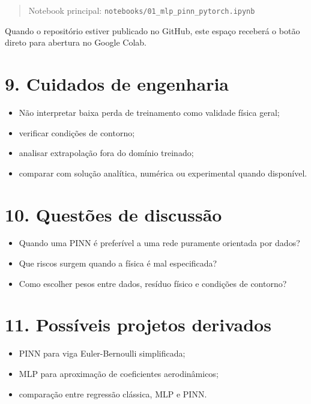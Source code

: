 \documentclass[
  brazilian,
  a4paper,
  DIV=11,
  numbers=noendperiod]{scrreprt}
\providecommand{\tightlist}{%
  \setlength{\itemsep}{0pt}\setlength{\parskip}{0pt}}
\begin{document}
\begin{quote}
Notebook principal: \texttt{notebooks/01\_mlp\_pinn\_pytorch.ipynb}
\end{quote}

Quando o repositório estiver publicado no GitHub, este espaço receberá o
botão direto para abertura no Google Colab.

\section{9. Cuidados de engenharia}\label{cuidados-de-engenharia}

\begin{itemize}
\tightlist
\item
  Não interpretar baixa perda de treinamento como validade física geral;
\item
  verificar condições de contorno;
\item
  analisar extrapolação fora do domínio treinado;
\item
  comparar com solução analítica, numérica ou experimental quando
  disponível.
\end{itemize}

\section{10. Questões de discussão}\label{questuxf5es-de-discussuxe3o}

\begin{itemize}
\tightlist
\item
  Quando uma PINN é preferível a uma rede puramente orientada por dados?
\item
  Que riscos surgem quando a física é mal especificada?
\item
  Como escolher pesos entre dados, resíduo físico e condições de
  contorno?
\end{itemize}

\section{11. Possíveis projetos
derivados}\label{possuxedveis-projetos-derivados}

\begin{itemize}
\tightlist
\item
  PINN para viga Euler-Bernoulli simplificada;
\item
  MLP para aproximação de coeficientes aerodinâmicos;
\item
  comparação entre regressão clássica, MLP e PINN.
\end{itemize}
\end{document}

